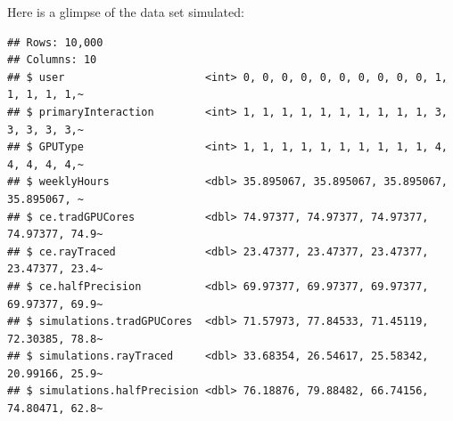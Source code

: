 \documentclass[
]{article}
\begin{document}
Here is a glimpse of the data set simulated:

\begin{verbatim}
## Rows: 10,000
## Columns: 10
## $ user                      <int> 0, 0, 0, 0, 0, 0, 0, 0, 0, 0, 1, 1, 1, 1, 1,~
## $ primaryInteraction        <int> 1, 1, 1, 1, 1, 1, 1, 1, 1, 1, 3, 3, 3, 3, 3,~
## $ GPUType                   <int> 1, 1, 1, 1, 1, 1, 1, 1, 1, 1, 4, 4, 4, 4, 4,~
## $ weeklyHours               <dbl> 35.895067, 35.895067, 35.895067, 35.895067, ~
## $ ce.tradGPUCores           <dbl> 74.97377, 74.97377, 74.97377, 74.97377, 74.9~
## $ ce.rayTraced              <dbl> 23.47377, 23.47377, 23.47377, 23.47377, 23.4~
## $ ce.halfPrecision          <dbl> 69.97377, 69.97377, 69.97377, 69.97377, 69.9~
## $ simulations.tradGPUCores  <dbl> 71.57973, 77.84533, 71.45119, 72.30385, 78.8~
## $ simulations.rayTraced     <dbl> 33.68354, 26.54617, 25.58342, 20.99166, 25.9~
## $ simulations.halfPrecision <dbl> 76.18876, 79.88482, 66.74156, 74.80471, 62.8~
\end{verbatim}
\end{document}

